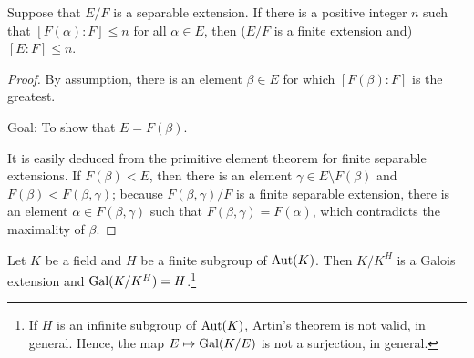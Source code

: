 \begin{prop}
    Suppose that $E/F$ is a separable extension.
    If there is a positive integer $n$ such that $[F(\alpha): F]\leq n$ for all $\alpha\in E$, then ($E/F$ is a finite extension and) $[E:F]\leq n$. 
\end{prop}
\begin{proof}
    By assumption, there is an element $\beta\in E$ for which $[F(\beta): F]$ is the greatest.
    \begin{center}
        Goal: To show that $E=F(\beta)$.
    \end{center}
    It is easily deduced from the primitive element theorem for finite separable extensions.
    If $F(\beta)<E$, then there is an element $\gamma\in E\setminus F(\beta)$ and $F(\beta)<F(\beta, \gamma)$; because $F(\beta, \gamma)/F$ is a finite separable extension, there is an element $\alpha\in F(\beta, \gamma)$ such that $F(\beta, \gamma)=F(\alpha)$, which contradicts the maximality of $\beta$.
\end{proof}
\begin{lem}
    Let $K$ be a field and $H$ be a finite subgroup of ${\textrm{Aut}({K})}$.
    Then $K/K^H$ is a Galois extension and ${\textrm{Gal}({K/K^H})}=H$.\footnote{If $H$ is an infinite subgroup of ${\textrm{Aut}({K})}$, Artin's theorem is not valid, in general. Hence, the map $E\mapsto{\textrm{Gal}({K/E})}$ is not a surjection, in general.}
\end{lem}
